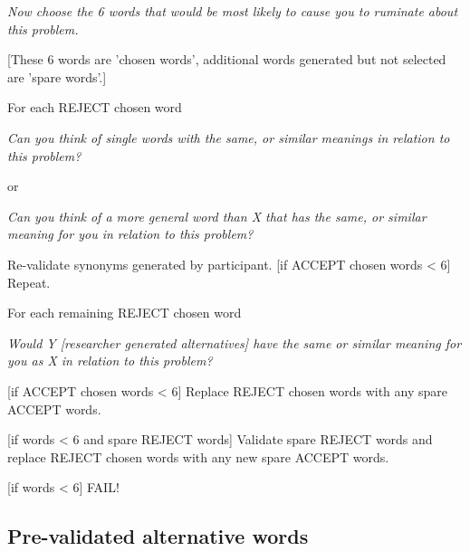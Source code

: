 \textit{Now choose the 6 words that would be most likely to cause you to ruminate about this
problem.}

[These 6 words are 'chosen words', additional words generated but not selected are 'spare words'.]

{\textup{For each REJECT chosen word}}

\textit{Can you think of single words with the same, or similar meanings in relation to this problem?}

or

\textit{Can you think of a more general word than \textup{X} that has
the same, or similar meaning for you in relation to this problem?}


\textup{Re-validate synonyms generated by participant. [if ACCEPT chosen words {\textless} 6] Repeat.}

\textup{For each remaining REJECT chosen word}

\textit{Would \textup{ Y [researcher generated alternatives]} have the same or similar meaning for you as \textup{X
} in relation to this problem?}

\textup{[if ACCEPT chosen words {\textless} 6] Replace REJECT chosen words with any spare
ACCEPT words.}

[if words {\textless} 6 and spare REJECT words] Validate spare REJECT words and replace REJECT chosen words with any new
spare ACCEPT words.

[if words {\textless} 6] FAIL!

\subsection{Pre-validated alternative words}

